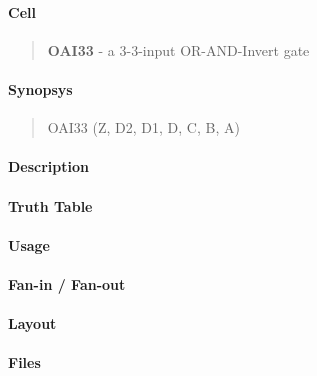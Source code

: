 \label{OAI33}
\paragraph{Cell}
\begin{quote}
    \textbf{OAI33} - a 3-3-input OR-AND-Invert gate
\end{quote}

\paragraph{Synopsys}
\begin{quote}
    OAI33 (Z, D2, D1, D, C, B, A)
\end{quote}

\paragraph{Description}

%

\paragraph{Truth Table}
%

\paragraph{Usage}

\paragraph{Fan-in / Fan-out}

\paragraph{Layout}

\paragraph{Files}
